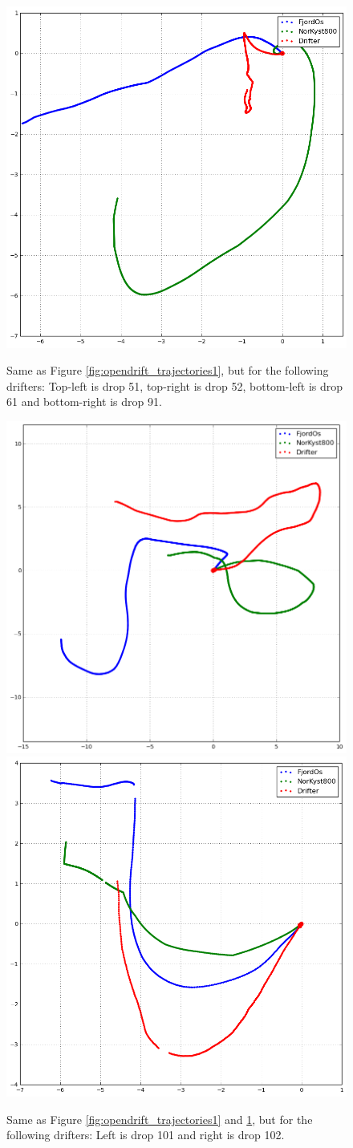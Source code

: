 \begin{figure}[ht]
{\includegraphics*[width=.5\textwidth]{Figurer/opendrift/skillscore/drop91i11}
}
\caption{\small
Same as Figure \ref{fig:opendrift_trajectories1}, but for the following drifters: Top-left is drop 51, top-right is drop 52, bottom-left is drop 61 and bottom-right is drop 91.}
\label{fig:opendrift_trajectories2}
\end{figure}

\begin{figure}[ht]
\centerline{
\includegraphics*[width=.5\textwidth]{Figurer/opendrift/skillscore/drop101i6}
\includegraphics*[width=.5\textwidth]{Figurer/opendrift/skillscore/drop102i9}
}
\caption{\small
Same as Figure \ref{fig:opendrift_trajectories1} and \ref{fig:opendrift_trajectories2}, but for the following drifters: Left is drop 101 and right is drop 102.}
\label{fig:opendrift_trajectories3}
\end{figure}


